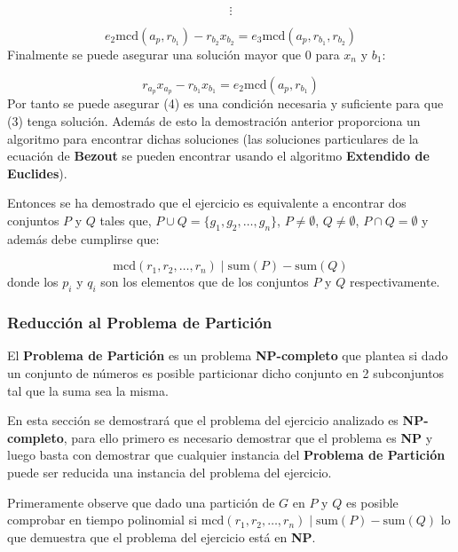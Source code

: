 \documentclass{article}
\begin{document}
$$\vdots $$

\begin{equation}
    e_{2}\text{mcd}(a_p, r_{b_1})-r_{b_2}x_{b_2} =e_{3}\text{mcd}(a_p, r_{b_1}, r_{b_2})
\end{equation}
Finalmente se puede asegurar una solución mayor que 0 para $x_n$ y $b_1$:

\begin{equation}
    r_{a_p}x_{a_p}-r_{b_1}x_{b_1} =e_{2}\text{mcd}(a_p, r_{b_1})
\end{equation}
Por tanto se puede asegurar (4) es una condición necesaria y suficiente para que (3) tenga solución. Además de esto la demostración
anterior proporciona un algoritmo para encontrar dichas soluciones (las soluciones particulares de la ecuación de \textbf{Bezout} se pueden encontrar
usando el algoritmo \textbf{Extendido de Euclides}).

Entonces se ha demostrado que el ejercicio es equivalente a encontrar dos conjuntos $P$ y $Q$ tales que, $P \cup Q =\{g_1,g_2, \ldots, g_n\}$,
$P \neq \emptyset $, $Q \neq \emptyset$, $P \cap Q=\emptyset$ y además debe cumplirse que:

\begin{equation}
    \text{mcd}(r_1,r_2,\ldots ,r_n) \mid \text{sum}(P) - \text{sum}(Q)
\end{equation}
donde los $p_i$ y $q_i$ son los elementos que de los conjuntos $P$ y $Q$ respectivamente.

\subsubsection{Reducción al Problema de Partición}

El \textbf{Problema de Partición} es un problema \textbf{NP-completo} que plantea si dado un conjunto de números es posible
particionar dicho conjunto en 2 subconjuntos tal que la suma sea la misma.

En esta sección se demostrará que el problema del ejercicio analizado es \textbf{NP-completo}, para ello primero es necesario demostrar
que el problema es \textbf{NP} y luego basta con demostrar que cualquier instancia del \textbf{Problema de Partición} puede ser reducida
una instancia del problema del ejercicio.

Primeramente observe que dado una partición de $G$ en $P$ y $Q$ es posible comprobar en tiempo polinomial si $\text{mcd}(r_1,r_2,\ldots ,r_n) \mid \text{sum}(P) - \text{sum}(Q)$
lo que demuestra que el problema del ejercicio está en \textbf{NP}.
\end{document}
